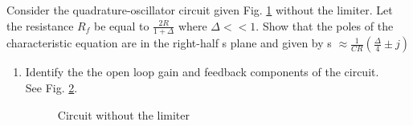 Consider the quadrature-oscillator circuit given Fig. \ref{fig:es17btech11009_fig1} without the limiter. Let the resistance $R_{f}$ be equal to $\frac{2R}{1 + \Delta}$ where $\Delta << 1$. Show that the poles of the characteristic equation are in the right-half s plane and given by 
s $\approx \frac{1}{CR}(\frac{\Delta}{4}\pm j)$
\begin{figure}[!ht]
	\begin{center}
		\resizebox{\columnwidth}{!}{}
	\end{center}
\caption{}
\label{fig:es17btech11009_fig1}
\end{figure}
\begin{enumerate}[label=\arabic*.,ref=\theenumi]
\item Identify the the open loop gain and feedback  components of the circuit.
\\
\solution See Fig. \ref{fig:es17btech11009_b4}.
\begin{figure}[!ht]
	\begin{center}
		\resizebox{\columnwidth}{!}{}
	\end{center}
\caption{Circuit without the limiter}
\label{fig:es17btech11009_b4}
\end{figure}


\end{enumerate}
